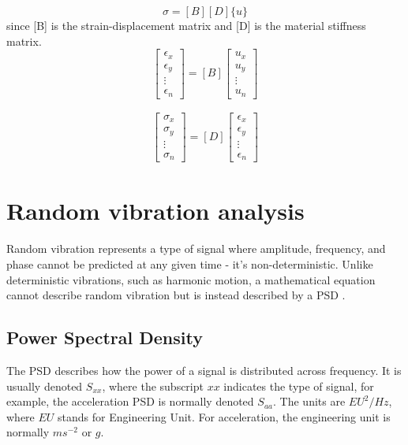 \documentclass[a4paper,twoside]{bth}
\begin{document}
\begin{equation} \label{eq:sigma_BDU}
    \sigma = [B][D]\{u\}
\end{equation}
since [B] is the strain-displacement matrix and [D] is the material stiffness matrix.
\begin{equation}
\begin{bmatrix}
\epsilon_x \\
\epsilon_y \\
\vdots\\
\epsilon_n
\end{bmatrix}
=
[B]
\begin{bmatrix}
u_x \\
u_y \\
\vdots\\
u_{n}
\end{bmatrix}
\end{equation}


\begin{align}
    \begin{bmatrix}
        \sigma_x \\
        \sigma_y \\
        \vdots\\
        \sigma_n
    \end{bmatrix}
    =
    [D]
    \begin{bmatrix}
        \epsilon_x \\
        \epsilon_y \\
        \vdots\\
        \epsilon_n
    \end{bmatrix}
\end{align}
\newpage
\section{Random vibration analysis}
Random vibration represents a type of signal where amplitude, frequency, and phase cannot be predicted at any given time - it's non-deterministic. Unlike deterministic vibrations, such as harmonic motion, a mathematical equation cannot describe random vibration but is instead described by a \ac{PSD} \cite{33}.

\subsection{Power Spectral Density}
The \ac{PSD} describes how the power of a signal is distributed across frequency. It is usually denoted $S_{xx}$, where the subscript $xx$ indicates the type of signal, for example, the acceleration \ac{PSD} is normally denoted $S_{aa}$. The units are $EU^2/Hz$, where $EU$ stands for Engineering Unit. For acceleration, the engineering unit is normally $ms^{-2}$ or $g$.
\end{document}

